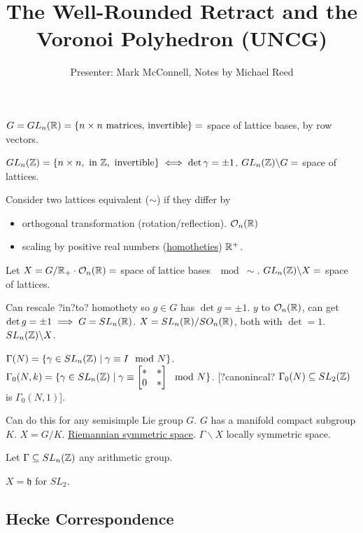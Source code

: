 \documentclass[]{article}
\title{The Well-Rounded Retract and the Voronoi Polyhedron (UNCG)}
\author{Presenter: Mark McConnell, Notes by Michael Reed}
\begin{document}
\maketitle

$G = GL_n(\mathbb{R}) = \{n\times n \text{ matrices, invertible}\} = $ space of lattice bases, by row vectors.

$GL_n(\mathbb{Z}) = \{n\times n, \text{ in } \mathbb{Z}, \text{ invertible}\} \iff \det\gamma = \pm 1$. $GL_n(\mathbb{Z})\backslash G = $ space of lattices.

Consider two lattices equivalent ($\sim$) if they differ by
\begin{itemize}
	\item orthogonal transformation (rotation/reflection). $\mathcal{O}_n(\mathbb{R})$
	\item scaling by positive real numbers (\ul{homotheties}) $\mathbb{R}^+$.
\end{itemize}
Let $X = G/\mathbb{R}_+\cdot \mathcal{O}_n(\mathbb{R}) = $ space of lattice bases $\mod \sim$. $GL_n(\mathbb{Z})\backslash X = $ space of lattices.

\begin{remark}
	Can rescale ?in?to? homothety so $g\in G$ has $\det g = \pm 1$. $y$ to $\mathcal{O}_n(\mathbb{R})$, can get $\det g = \pm 1 \implies G = SL_n(\mathbb{R})$. $X = SL_n(\mathbb{R})/SO_n(\mathbb{R})$, both with $\det = 1$. $SL_n(\mathbb{Z})\backslash X$.
\end{remark}
\begin{remark}
	$\Gamma(N) = \{\gamma \in SL_n(\mathbb{Z})\mid \gamma \equiv I\mod N\}$. $\Gamma_0(N,k) = \{\gamma \in SL_n(\mathbb{Z})\mid \gamma \equiv \begin{bmatrix}*&*\\0&*\end{bmatrix}\mod N\}$. [?canonincal? $\Gamma_0(N)\subseteq SL_2(\mathbb{Z})$ is $\Gamma_0(N,1)$].
\end{remark}
\begin{remark}
	Can do this for any semisimple Lie group $G$. $G$ has a manifold compact subgroup $K$. $X = G/K$. \ul{Riemannian symmetric space}. $\Gamma\backslash X$ locally symmetric space.
\end{remark}

Let $\Gamma \subseteq SL_n(\mathbb{Z})$ any arithmetic group.

\begin{remark}
	$X = \mathfrak{h}$ for $SL_2$.
\end{remark}

\subsection*{Hecke Correspondence}
\end{document}
